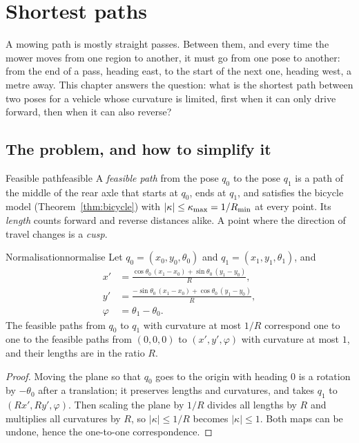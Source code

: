 \chapter{Shortest paths}
\label{ch:paths}

A mowing path is mostly straight passes. Between them, and every time the
mower moves from one region to another, it must go from one pose to another:
from the end of a pass, heading east, to the start of the next one, heading
west, a metre away. This chapter answers the question: what is the shortest
path between two poses for a vehicle whose curvature is limited, first when
it can only drive forward, then when it can also reverse?

\section{The problem, and how to simplify it}

\begin{definition}{Feasible path}{feasible}
  A \emph{feasible path} from the pose $q_0$ to the pose $q_1$ is a path of
  the middle of the rear axle that starts at $q_0$, ends at $q_1$, and
  satisfies the bicycle model (Theorem~\ref{thm:bicycle}) with
  $|\kappa| \le \kappa_{\max} = 1/R_{\min}$ at every point. Its \emph{length} counts
  forward and reverse distances alike. A point where the direction of travel
  changes is a \emph{cusp}.
\end{definition}

\begin{proposition}{Normalisation}{normalise}
  Let $q_0 = (x_0, y_0, \theta_0)$ and $q_1 = (x_1, y_1, \theta_1)$, and
  \begin{align*}
    x' &= \frac{\cos\theta_0\,(x_1 - x_0) + \sin\theta_0\,(y_1 - y_0)}{R},
    \\
    y' &= \frac{-\sin\theta_0\,(x_1 - x_0) + \cos\theta_0\,(y_1 - y_0)}{R},
    \\
    \varphi &= \theta_1 - \theta_0 .
  \end{align*}
  The feasible paths from $q_0$ to $q_1$ with curvature at most $1/R$
  correspond one to one to the feasible paths from $(0, 0, 0)$ to
  $(x', y', \varphi)$ with curvature at most $1$, and their lengths are in
  the ratio $R$.
\end{proposition}

\begin{proof}
  Moving the plane so that $q_0$ goes to the origin with heading $0$ is a
  rotation by $-\theta_0$ after a translation; it preserves lengths and
  curvatures, and takes $q_1$ to $(R x', R y', \varphi)$. Then scaling the
  plane by $1/R$ divides all lengths by $R$ and multiplies all curvatures by
  $R$, so $|\kappa| \le 1/R$ becomes $|\kappa| \le 1$. Both maps can be
  undone, hence the one-to-one correspondence.
\end{proof}

